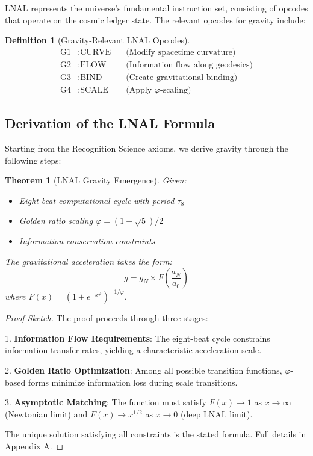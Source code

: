\documentclass[12pt,a4paper]{article}
\newtheorem{theorem}{Theorem}
\newtheorem{definition}{Definition}
\begin{document}
LNAL represents the universe's fundamental instruction set, consisting of opcodes that operate on the cosmic ledger state. The relevant opcodes for gravity include:

\begin{definition}[Gravity-Relevant LNAL Opcodes]
\begin{align}
\text{G1} &: \text{CURVE} \quad &\text{(Modify spacetime curvature)} \\
\text{G2} &: \text{FLOW} \quad &\text{(Information flow along geodesics)} \\
\text{G3} &: \text{BIND} \quad &\text{(Create gravitational binding)} \\
\text{G4} &: \text{SCALE} \quad &\text{(Apply } \varphi\text{-scaling)}
\end{align}
\end{definition}

\subsection{Derivation of the LNAL Formula}

Starting from the Recognition Science axioms, we derive gravity through the following steps:

\begin{theorem}[LNAL Gravity Emergence]
Given:
\begin{itemize}
\item Eight-beat computational cycle with period $\tau_8$
\item Golden ratio scaling $\varphi = (1+\sqrt{5})/2$
\item Information conservation constraints
\end{itemize}
The gravitational acceleration takes the form:
\begin{equation}
g = g_N \times F\left(\frac{a_N}{a_0}\right)
\end{equation}
where $F(x) = (1 + e^{-x^\varphi})^{-1/\varphi}$.
\end{theorem}

\begin{proof}[Proof Sketch]
The proof proceeds through three stages:

1. \textbf{Information Flow Requirements}: The eight-beat cycle constrains information transfer rates, yielding a characteristic acceleration scale.

2. \textbf{Golden Ratio Optimization}: Among all possible transition functions, $\varphi$-based forms minimize information loss during scale transitions.

3. \textbf{Asymptotic Matching}: The function must satisfy $F(x) \to 1$ as $x \to \infty$ (Newtonian limit) and $F(x) \to x^{1/2}$ as $x \to 0$ (deep LNAL limit).

The unique solution satisfying all constraints is the stated formula. Full details in Appendix A.
\end{proof}
\end{document}
